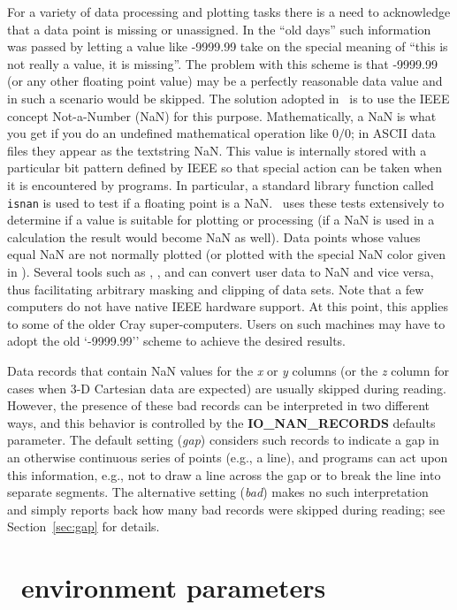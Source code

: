 For a variety of data processing and plotting tasks there is a need to acknowledge that
a data point is missing or unassigned.  In the ``old days'' such information was passed
by letting a value like -9999.99 take on the special meaning of ``this is not really a
value, it is missing''.  The problem with this scheme is that -9999.99 (or any other
floating point value) may be a perfectly reasonable data value and in such a scenario
would be skipped.  The solution adopted in \GMT\ is to use the IEEE concept Not-a-Number
(NaN) for this purpose.  Mathematically, a NaN is what you get if you do an undefined
mathematical operation like $0/0$; in ASCII data files they appear as the textstring NaN.
This value is internally stored with a particular bit pattern
defined by IEEE so that special action can be taken when it is encountered by programs.
In particular, a standard library function called \texttt{isnan} is used to test if a floating point
is a NaN.  \GMT\ uses these tests extensively to determine if a value is suitable for plotting
or processing (if a NaN is used in a calculation the result would become NaN as well).  Data points
whose values equal NaN are not normally plotted (or plotted with the special NaN color given in
).  Several tools such as , , and
 can convert user data to NaN and vice versa, thus facilitating arbitrary
masking and clipping of data sets.  Note that a few computers do not have native IEEE hardware
support.  At this point, this applies to some of the older Cray super-computers.  Users on such
machines may have to adopt the old `-9999.99'' scheme to achieve the desired results.

Data records that contain NaN values for the {\it x} or {\it y} columns (or the {\it z} column
for cases when 3-D Cartesian data are expected) are usually skipped during reading.  However,
the presence of these bad records can be interpreted in two different ways, and this behavior
is controlled by the \textbf{IO\_NAN\_RECORDS} defaults parameter.  The default setting (\emph{gap})
considers such records to indicate a gap in an otherwise continuous series of points (e.g., a line),
and programs can act upon this information, e.g., not to draw a line across the gap or to break the line
into separate segments.  The alternative setting (\emph{bad}) makes no such interpretation and
simply reports back how many bad records were skipped during reading; see Section~\ref{sec:gap} for details.

\section{\gmt\ environment parameters}

